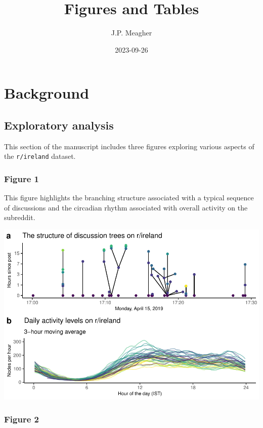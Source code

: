 \documentclass[
]{article}
\title{Figures and Tables}
\author{J.P. Meagher}
\date{2023-09-26}
\begin{document}
\maketitle

\hypertarget{background}{%
\section{Background}\label{background}}

\hypertarget{exploratory-analysis}{%
\subsection{Exploratory analysis}\label{exploratory-analysis}}

This section of the manuscript includes three figures exploring various
aspects of the \texttt{r/ireland} dataset.

\hypertarget{figure-1}{%
\subsubsection{Figure 1}\label{figure-1}}

This figure highlights the branching structure associated with a typical
sequence of discussions and the circadian rhythm associated with overall
activity on the subreddit.

\includegraphics{figures_and_tables_files/figure-latex/data_exploration-1.pdf}

\hypertarget{figure-2}{%
\subsubsection{Figure 2}\label{figure-2}}
\end{document}
